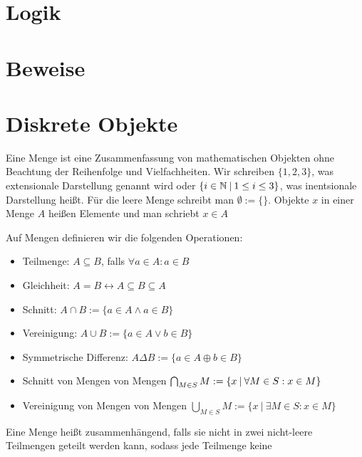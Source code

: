 \section{Logik}

\section{Beweise}

\section{Diskrete Objekte}

\begin{definition}[Menge]
	Eine Menge ist eine Zusammenfassung von mathematischen Objekten ohne Beachtung der Reihenfolge und Vielfachheiten. Wir schreiben $\{1, 2, 3\}$, was extensionale Darstellung genannt wird oder $\{i \in \mathbb{N} \medspace | \medspace 1 \leq i \leq 3  \}$, was inentsionale Darstellung heißt. Für die leere Menge schreibt man $\emptyset := \{\}$. Objekte $x$ in einer Menge $A$ heißen Elemente und man schriebt $x \in A$
\end{definition}
\begin{definition}
	Auf Mengen definieren wir die folgenden Operationen:
	\begin{itemize}[noitemsep]
		\item Teilmenge: $A \subseteq B$, falls $\forall a \in A : a \in B$
		\item Gleichheit: $A = B \leftrightarrow A \subseteq B \subseteq A$
		\item Schnitt: $A \cap B := \{ a \in A \land a \in B\}$
		\item Vereinigung: $A \cup B := \{ a \in A \lor b \in B\}$
		\item Symmetrische Differenz: $A \Delta B := \{a \in A \oplus b \in B\}$
		\item Schnitt von Mengen von Mengen $\bigcap_{M \in S} M := \{x \medspace | \medspace \forall M \in S: x \in M\}$
		\item Vereinigung von Mengen von Mengen $\bigcup_{M \in S} M := \{x \medspace | \medspace \exists M \in S: x \in M\}$
	\end{itemize}


	Eine Menge heißt zusammenhängend, falls sie nicht in zwei nicht-leere Teilmengen geteilt werden kann, sodass jede Teilmenge keine 

\end{definition}

